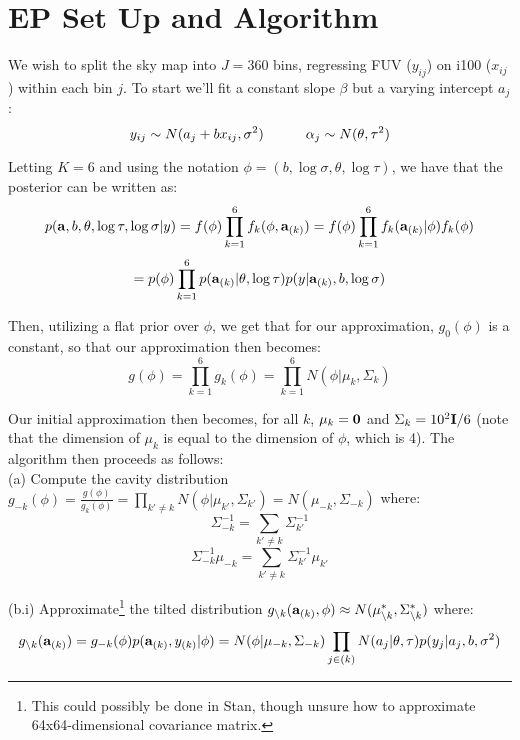 \documentclass[12pt]{article}
\begin{document}

\def\ci{\perp\!\!\!\perp}
\def\ex{\mathbb{E}}
\def\prob{\mathbb{P}}
\def\ind{\mathbb{I}}
\def\grad{\triangledown}
\def\bigo{\mathcal{O}}

\section*{EP Set Up and Algorithm}
We wish to split the sky map into $J=360$ bins, regressing FUV ($y_{ij}$) on i100 ($x_{ij}$) within each bin $j$. To start we'll fit a constant slope $\beta$ but a varying intercept $a_j$:
$$ y_{ij} \sim N(a_j + b x_{ij}, \sigma^2) \hspace{30 pt} \alpha_j \sim N(\theta, \tau^2)$$

\noindent Letting $K=6$ and using the notation $\phi = (b,\log \sigma,\theta,\log \tau)$, we have that the posterior can be written as:
$$ p( {\bf a}, b, \theta,\log \tau, \log \sigma | y) = f(\phi) \prod_{k=1}^6 f_k(\phi, {\bf a}_{(k)}) = f(\phi) \prod_{k=1}^6 f_k({\bf a}_{(k)} | \phi) f_k (\phi)$$
$$ = p(\phi) \prod_{k=1}^6 p({\bf a}_{(k)} | \theta,\log \tau) p(y | {\bf a}_{(k)}, b,\log \sigma)$$

\noindent Then, utilizing a flat prior over $\phi$, we get that for our approximation, $g_0(\phi)$ is a constant, so that our approximation then becomes:
$$ g(\phi) = \prod_{k=1}^6 g_k(\phi) = \prod_{k=1}^6 N(\phi| \mu_k,\Sigma_k)$$

\noindent Our initial approximation then becomes, for all $k$, $\mu_k = {\bf 0}$ and $\Sigma_k = 10^2 {\bf I} / 6$ (note that the dimension of $\mu_k$ is equal to the dimension of $\phi$, which is 4). The algorithm then proceeds as follows:\\

\indent (a) Compute the cavity distribution $g_{-k}(\phi) = \frac{g(\phi)}{g_k(\phi)} = \prod_{k' \neq k} N(\phi | \mu_{k'} , \Sigma_{k'}) = N( \mu_{-k},\Sigma_{-k})$ where:
$$ \Sigma_{-k}^{-1} = \sum_{k' \neq k} \Sigma_{k'}^{-1}$$
$$ \Sigma_{-k}^{-1}\mu_{-k} = \sum_{k' \neq k} \Sigma_{k'}^{-1} \mu_{k'}$$

\indent (b.i) Approximate\footnote{This could possibly be done in Stan, though unsure how to approximate 64x64-dimensional covariance matrix.} the tilted distribution $g_{\backslash k} ({\bf a}_{(k)},\phi) \approx N(\mu_{\backslash k}^*,\Sigma_{\backslash k}^*)$ where:
$$ g_{\backslash k} ({\bf a}_{(k)}) = g_{-k}(\phi) p({\bf a}_{(k)},y_{(k)}|\phi) = N(\phi | \mu_{-k}, \Sigma_{-k}) \prod_{j\in (k)} N(a_j | \theta, \tau) p(y_j | a_j, b, \sigma^2)$$
\end{document}
